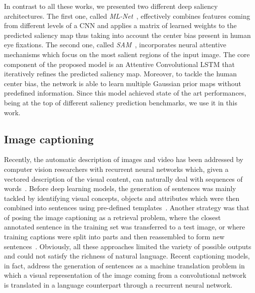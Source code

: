 In contrast to all these works, we presented two different deep saliency architectures. The first one, called \textit{ML-Net}~\cite{mlnet2016}, effectively combines features coming from different levels of a CNN and applies a matrix of learned weights to the predicted saliency map thus taking into account the center bias present in human eye fixations. The second one, called \textit{SAM}~\cite{cornia2017sam}, incorporates neural attentive mechanisms which focus on the most salient regions of the input image. The core component of the proposed model is an Attentive Convolutional LSTM that iteratively refines the predicted saliency map. Moreover, to tackle the human center bias, the network is able to learn multiple Gaussian prior maps without predefined information. Since this model achieved state of the art performances, being at the top of different saliency prediction benchmarks, we use it in this work.

\subsection{Image captioning}
Recently, the automatic description of images and video has been addressed by computer vision researchers with recurrent neural networks which, given a vectored description of the visual content, can naturally deal with sequences of words~\cite{vinyals2015show,karpathy2015deep,baraldi17cvpr}. Before deep learning models, the generation of sentences was mainly tackled by identifying visual concepts, objects and attributes which were then combined into sentences using pre-defined templates~\cite{yao2010i2t,yang2011corpus,kulkarni2013babytalk}. Another strategy was that of posing the image captioning as a retrieval problem, where the closest annotated sentence in the training set was transferred to a test image, or where training captions were split into parts and then reassembled to form new sentences~\cite{farhadi2010every,ordonez2011im2text,hodosh2013framing,socher2014grounded}. Obviously, all these approaches limited the variety of possible outputs and could not satisfy the richness of natural language. Recent captioning models, in fact, address the generation of sentences as a machine translation problem in which a visual representation of the image coming from a convolutional network is translated in a language counterpart through a recurrent neural network.

